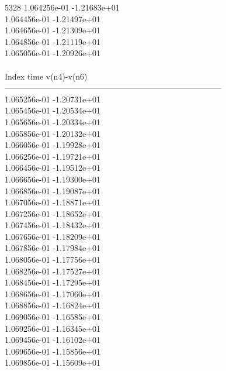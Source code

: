 5328	1.064256e-01	-1.21683e+01	\\ 	1.064456e-01	-1.21497e+01	\\ 	1.064656e-01	-1.21309e+01	\\ 	1.064856e-01	-1.21119e+01	\\ 	1.065056e-01	-1.20926e+01	\\ \hline
\\ \hline
Index   time            v(n4)-v(n6)     \\ \hline
--------------------------------------------------------------------------------\\ 	1.065256e-01	-1.20731e+01	\\ 	1.065456e-01	-1.20534e+01	\\ 	1.065656e-01	-1.20334e+01	\\ 	1.065856e-01	-1.20132e+01	\\ 	1.066056e-01	-1.19928e+01	\\ 	1.066256e-01	-1.19721e+01	\\ 	1.066456e-01	-1.19512e+01	\\ 	1.066656e-01	-1.19300e+01	\\ 	1.066856e-01	-1.19087e+01	\\ 	1.067056e-01	-1.18871e+01	\\ 	1.067256e-01	-1.18652e+01	\\ 	1.067456e-01	-1.18432e+01	\\ 	1.067656e-01	-1.18209e+01	\\ 	1.067856e-01	-1.17984e+01	\\ 	1.068056e-01	-1.17756e+01	\\ 	1.068256e-01	-1.17527e+01	\\ 	1.068456e-01	-1.17295e+01	\\ 	1.068656e-01	-1.17060e+01	\\ 	1.068856e-01	-1.16824e+01	\\ 	1.069056e-01	-1.16585e+01	\\ 	1.069256e-01	-1.16345e+01	\\ 	1.069456e-01	-1.16102e+01	\\ 	1.069656e-01	-1.15856e+01	\\ 	1.069856e-01	-1.15609e+01	\\ \hline
